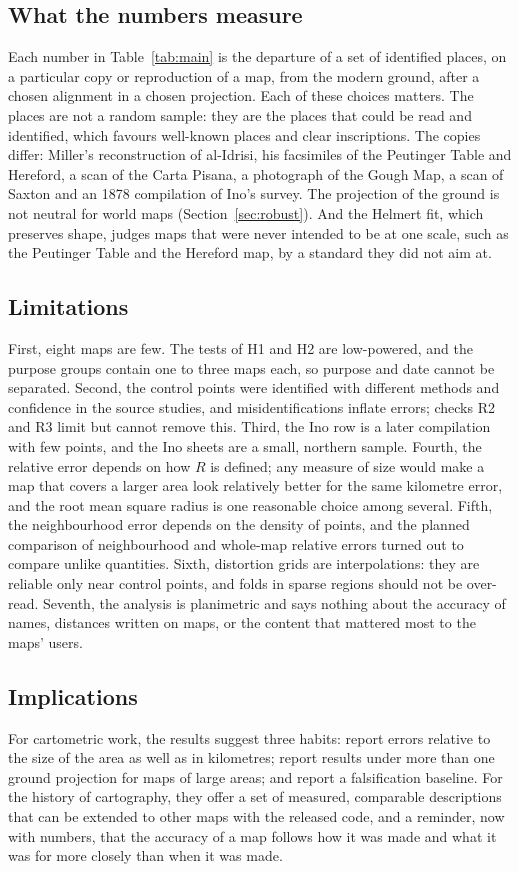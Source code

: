 \documentclass[11pt,a4paper]{article}
\begin{document}
\subsection{What the numbers measure}
Each number in Table~\ref{tab:main} is the departure of a set of identified places, on a particular copy or reproduction of a map, from the modern ground, after a chosen alignment in a chosen projection. Each of these choices matters. The places are not a random sample: they are the places that could be read and identified, which favours well-known places and clear inscriptions. The copies differ: Miller's reconstruction of al-Idrisi, his facsimiles of the Peutinger Table and Hereford, a scan of the Carta Pisana, a photograph of the Gough Map, a scan of Saxton and an 1878 compilation of Ino's survey. The projection of the ground is not neutral for world maps (Section~\ref{sec:robust}). And the Helmert fit, which preserves shape, judges maps that were never intended to be at one scale, such as the Peutinger Table and the Hereford map, by a standard they did not aim at.

\subsection{Limitations}
First, eight maps are few. The tests of H1 and H2 are low-powered, and the purpose groups contain one to three maps each, so purpose and date cannot be separated. Second, the control points were identified with different methods and confidence in the source studies, and misidentifications inflate errors; checks R2 and R3 limit but cannot remove this. Third, the Ino row is a later compilation with few points, and the Ino sheets are a small, northern sample. Fourth, the relative error depends on how $R$ is defined; any measure of size would make a map that covers a larger area look relatively better for the same kilometre error, and the root mean square radius is one reasonable choice among several. Fifth, the neighbourhood error depends on the density of points, and the planned comparison of neighbourhood and whole-map relative errors turned out to compare unlike quantities. Sixth, distortion grids are interpolations: they are reliable only near control points, and folds in sparse regions should not be over-read. Seventh, the analysis is planimetric and says nothing about the accuracy of names, distances written on maps, or the content that mattered most to the maps' users.

\subsection{Implications}
For cartometric work, the results suggest three habits: report errors relative to the size of the area as well as in kilometres; report results under more than one ground projection for maps of large areas; and report a falsification baseline. For the history of cartography, they offer a set of measured, comparable descriptions that can be extended to other maps with the released code, and a reminder, now with numbers, that the accuracy of a map follows how it was made and what it was for more closely than when it was made.
\end{document}
